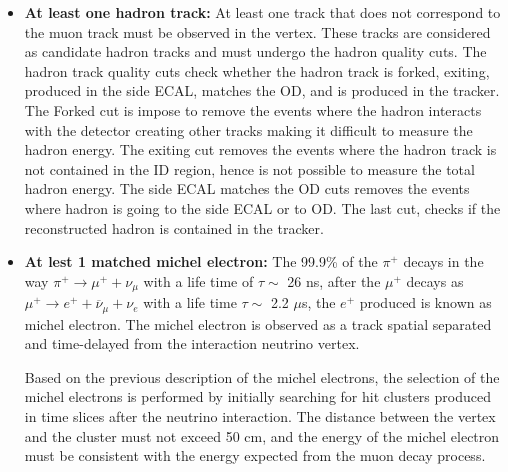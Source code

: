 \begin{itemize}
    \item \textbf{At least one hadron track:} At least one track that does not correspond to the muon track must be observed in the vertex. These tracks are considered as candidate hadron tracks and must undergo the hadron quality cuts. The hadron track quality cuts check whether the hadron track is forked, exiting, produced in the side ECAL, matches the OD, and is produced in the tracker. The Forked cut is impose to remove the events where the hadron interacts with the detector creating other tracks making it difficult to measure the hadron energy. The exiting cut removes the events where the hadron track is not contained in the ID region, hence is not possible to measure the total hadron energy. The side ECAL matches the OD cuts removes the events where hadron is going to the side ECAL or to OD. The last cut, checks if the reconstructed hadron is contained in the tracker.
    \item \textbf{At lest 1 matched michel electron:} The 99.9\% of the $\pi^+$ decays in the way $\pi^+\xrightarrow{}\mu^+ + \nu_\mu$ with a life time of $\tau \sim$ 26 ns, after the $\mu^+$ decays as $\mu^+\xrightarrow{} e^+ + \overline{\nu}_\mu + \nu_e$ with a life time $\tau\sim$ 2.2 \(\mu\)s, the $e^+$ produced is known as michel electron. The michel electron is observed as a track spatial separated and time-delayed from the interaction neutrino vertex. 

    Based on the previous description of the michel electrons, the selection of the michel electrons is performed by initially searching for hit clusters produced in time slices after the neutrino interaction. The distance between the vertex and the cluster must not exceed 50 cm, and the energy of the michel electron must be consistent with the energy expected from the muon decay process.  


\end{itemize}
